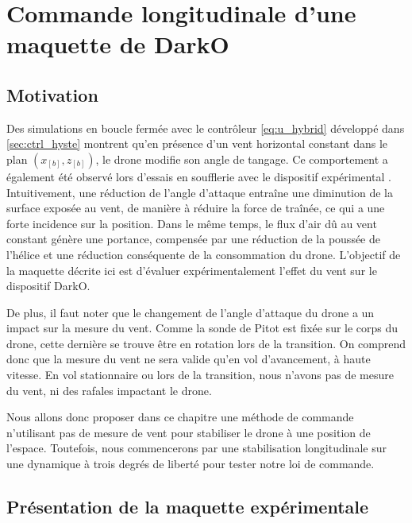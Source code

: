 \chapter{Commande longitudinale d'une maquette de DarkO}
\minitoc
\label{chap:3DOF}

\section{Motivation}
\label{sec:motivation3DOF}
Des simulations en boucle fermée avec le contrôleur \eqref{eq:u_hybrid} développé dans \ref{sec:ctrl_hyste} montrent qu'en présence d'un vent horizontal constant dans le plan $(x_{[b]},z_{[b]})$, le drone modifie son angle de tangage. Ce comportement a également été observé lors d'essais en soufflerie avec le dispositif expérimental \cite{olszaneckibarthHal-02542982}. Intuitivement, une réduction de l'angle d'attaque entraîne une diminution de la surface exposée au vent, de manière à réduire la force de traînée, ce qui a une forte incidence sur la position. Dans le même temps, le flux d'air dû au vent constant génère une portance, compensée par une réduction de la poussée de l'hélice et une réduction conséquente de la consommation du drone. L'objectif de la maquette décrite ici est d'évaluer expérimentalement l'effet du vent sur le dispositif DarkO.

De plus, il faut noter que le changement de l'angle d'attaque du drone a un impact sur la mesure du vent. Comme la sonde de Pitot est fixée sur le corps du drone, cette dernière se trouve être en rotation lors de la transition. On comprend donc que la mesure du vent ne sera valide qu'en vol d'avancement, à haute vitesse. En vol stationnaire ou lors de la transition, nous n'avons pas de mesure du vent, ni des rafales impactant le drone.

Nous allons donc proposer dans ce chapitre une méthode de commande n'utilisant pas de mesure de vent pour stabiliser le drone à une position de l'espace. Toutefois, nous commencerons par une stabilisation longitudinale sur une dynamique à trois degrés de liberté pour tester notre loi de commande.

\section{Présentation de la maquette expérimentale}
\label{sec:test_bench}



